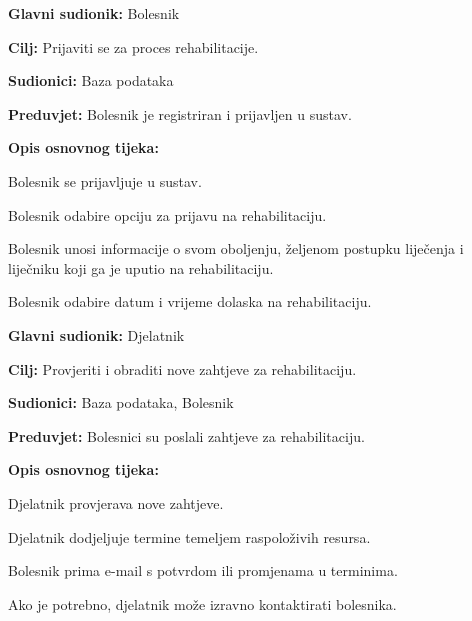 \documentclass{article}
\begin{document}
\begin{packed_item}
\item \textbf{Glavni sudionik:} Bolesnik
\item \textbf{Cilj:} Prijaviti se za proces rehabilitacije.
\item \textbf{Sudionici:} Baza podataka
\item \textbf{Preduvjet:} Bolesnik je registriran i prijavljen u sustav.
\item \textbf{Opis osnovnog tijeka:}
\begin{packed_enum}
\item Bolesnik se prijavljuje u sustav.
\item Bolesnik odabire opciju za prijavu na rehabilitaciju.
\item Bolesnik unosi informacije o svom oboljenju, željenom postupku liječenja i liječniku koji ga je uputio na rehabilitaciju.
\item Bolesnik odabire datum i vrijeme dolaska na rehabilitaciju.
\end{packed_enum}
\end{packed_item}
\vspace{1em} %

\begin{packed_item}
\item \textbf{Glavni sudionik:} Djelatnik
\item \textbf{Cilj:} Provjeriti i obraditi nove zahtjeve za rehabilitaciju.
\item \textbf{Sudionici:} Baza podataka, Bolesnik
\item \textbf{Preduvjet:} Bolesnici su poslali zahtjeve za rehabilitaciju.
\item \textbf{Opis osnovnog tijeka:}
\begin{packed_enum}
\item Djelatnik provjerava nove zahtjeve.
\item Djelatnik dodjeljuje termine temeljem raspoloživih resursa.
\item Bolesnik prima e-mail s potvrdom ili promjenama u terminima.
\item Ako je potrebno, djelatnik može izravno kontaktirati bolesnika.
\end{packed_enum}
\end{packed_item}
\end{document}
